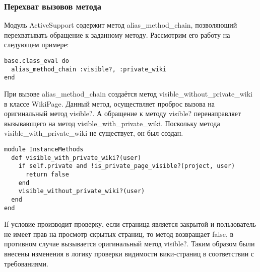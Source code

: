 \subsubsection{Перехват вызовов метода}
Модуль ActiveSupport содержит метод alias\_method\_chain, позволяющий
перехватывать обращение к заданному методу. Рассмотрим его работу на следующем
примере:
\small{
\begin{lstlisting}
base.class_eval do
  alias_method_chain :visible?, :private_wiki
end
\end{lstlisting}}
При вызове alias\_method\_chain создаётся метод
visible\_without\_private\_wiki в классе WikiPage. Данный метод, осуществляет
проброс вызова на оригинальный метод visible?. А обращение к методу visible?
перенаправляет вызывающего на метод visible\_with\_private\_wiki. Поскольку
метода visible\_with\_private\_wiki не существует, он был создан.
\small{
\begin{lstlisting}
module InstanceMethods
  def visible_with_private_wiki?(user)  
    if self.private and !is_private_page_visible?(project, user)
      return false
    end
    visible_without_private_wiki?(user)
  end
end
\end{lstlisting}}
If-условие производит проверку, если страница является закрытой и пользователь
не имеет прав на просмотр скрытых страниц, то метод возвращает false, в
противном случае вызывается оригинальный метод visible?. Таким образом были
внесены изменения в логику проверки видимости вики-страниц в соответствии с
требованиями.



